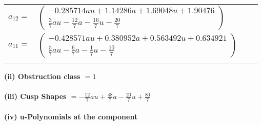 \documentclass[1p]{elsarticle_modified}
\theoremstyle{definition}
\begin{document}
\begin{tabular}{m{7pt} m{180pt} m{7pt} m{180pt} }
\flushright $a_{12}=$&$\begin{pmatrix}-0.285714 a u+1.14286 a+1.69048 u+1.90476\\\frac{3}{7} a u-\frac{12}{7} a-\frac{16}{7} u-\frac{20}{7}\end{pmatrix}$ \\
\flushright $a_{11}=$&$\begin{pmatrix}-0.428571 a u+0.380952 a+0.563492 u+0.634921\\\frac{5}{7} a u-\frac{6}{7} a-\frac{1}{7} u-\frac{10}{7}\end{pmatrix}$\\&\end{tabular}
\flushleft \textbf{(ii) Obstruction class $= 1$}\\~\\
\flushleft \textbf{(iii) Cusp Shapes $= -\frac{12}{7} a u+\frac{48}{7} a-\frac{20}{7} u+\frac{80}{7}$}\\~\\
\newpage\renewcommand{\arraystretch}{1}
\flushleft \textbf{(iv) u-Polynomials at the component}\newline \\
\end{document}
